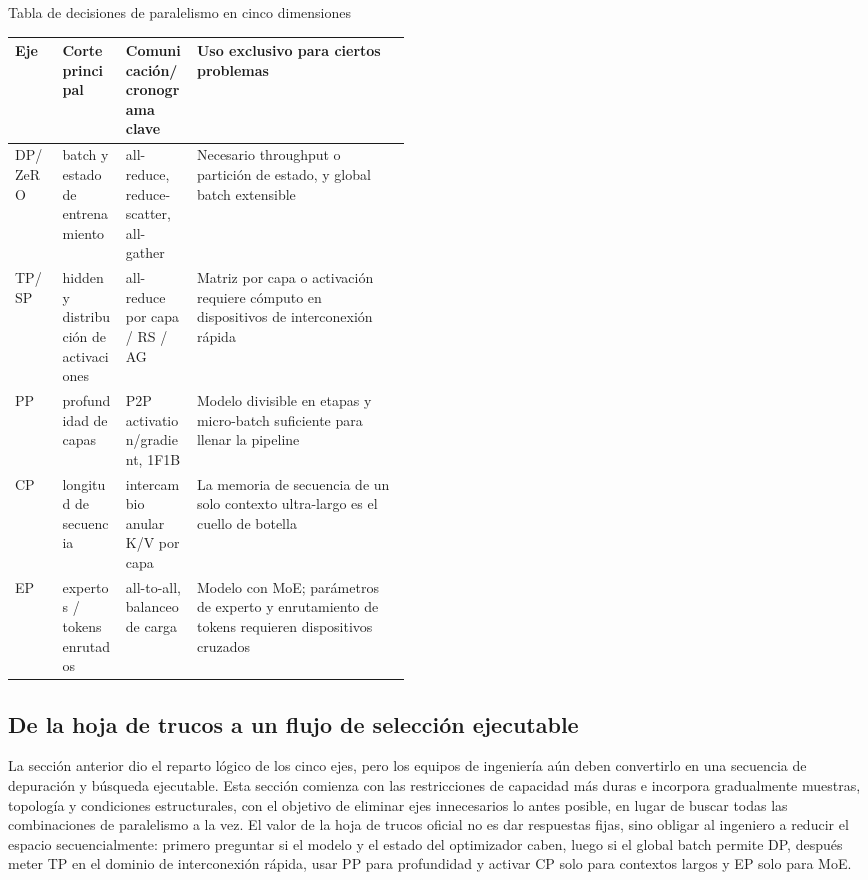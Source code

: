 \begin{knowledgebox}{Tabla de decisiones de paralelismo en cinco dimensiones}
\begin{tabularx}{\linewidth}{L{0.12\linewidth} L{0.16\linewidth} L{0.18\linewidth} X}
\toprule
Eje & Corte principal & Comunicación/cronograma clave & Uso exclusivo para ciertos problemas \\
\midrule
DP/ZeRO & batch y estado de entrenamiento & all-reduce, reduce-scatter, all-gather & Necesario throughput o partición de estado, y global batch extensible \\
TP/SP & hidden y distribución de activaciones & all-reduce por capa / RS / AG & Matriz por capa o activación requiere cómputo en dispositivos de interconexión rápida \\
PP & profundidad de capas & P2P activation/gradient, 1F1B & Modelo divisible en etapas y micro-batch suficiente para llenar la pipeline \\
CP & longitud de secuencia & intercambio anular K/V por capa & La memoria de secuencia de un solo contexto ultra-largo es el cuello de botella \\
EP & expertos / tokens enrutados & all-to-all, balanceo de carga & Modelo con MoE; parámetros de experto y enrutamiento de tokens requieren dispositivos cruzados \\
\bottomrule
\end{tabularx}
\end{knowledgebox}

\subsection{De la hoja de trucos a un flujo de selección ejecutable}

La sección anterior dio el reparto lógico de los cinco ejes, pero los equipos de ingeniería aún deben convertirlo en una secuencia de depuración y búsqueda ejecutable. Esta sección comienza con las restricciones de capacidad más duras e incorpora gradualmente muestras, topología y condiciones estructurales, con el objetivo de eliminar ejes innecesarios lo antes posible, en lugar de buscar todas las combinaciones de paralelismo a la vez. El valor de la hoja de trucos oficial no es dar respuestas fijas, sino obligar al ingeniero a reducir el espacio secuencialmente: primero preguntar si el modelo y el estado del optimizador caben, luego si el global batch permite DP, después meter TP en el dominio de interconexión rápida, usar PP para profundidad y activar CP solo para contextos largos y EP solo para MoE.

